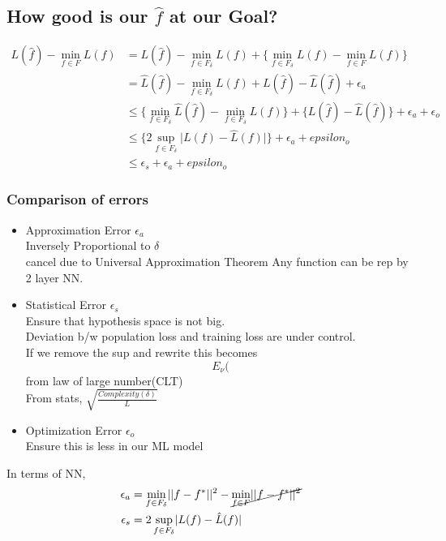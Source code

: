 \documentclass[11pt]{article}
\begin{document}
\subsection{How good is our \(\hat{f}\) at our Goal?}
\label{sec:org99a0065}
\begin{align*}
 L(\hat{f}) - \min_{f \in F}L(f) &= L(\hat{f})
                                   - \min_{f \in F_\delta} L(f)
                                   + \{\min_{f \in F_\delta} L(f)
                                   - \min_{f \in F} L(f) \} \\
  &= \hat{L}(\hat{f}) - \min_{f \in F_\delta} L(f) +
     L(\hat{f}) - \hat{L}(\hat{f}) + \epsilon_a \\
  &\leq \{ \min_{f \in F_\delta}\hat{L}(\hat{f}) -
    \min_{f \in F_\delta} L(f) \} + \{ L(\hat{f}) -
    \hat{L}(\hat{f}) \} + \epsilon_a + \epsilon_o \\
  &\leq \{ 2 \sup_{f \in F_\delta} \lvert L(f) - \hat{L}(f) \rvert \} +
    \epsilon_a + epsilon_o \\
  &\leq \epsilon_s + \epsilon_a + epsilon_o
\end{align*}

\subsubsection{Comparison of errors}
\label{sec:org37fe096}
\begin{itemize}
\item Approximation Error \(\epsilon_a\)\\
Inversely Proportional to \(\delta\)\\
cancel due to Universal Approximation Theorem Any function can be rep by 2 layer NN.\\
\item Statistical Error \(\epsilon_s\)\\
Ensure that hypothesis space is not big.\\
Deviation b/w population loss and training loss are under control.\\
If we remove the sup and rewrite this becomes\\
\[E_{\nu}(\] from law of large number(CLT)\\
From stats, \(\sqrt{\frac{Complexity(\delta)}{L}}\)\\
\item Optimization Error \(\epsilon_o\)\\
Ensure this is less in our ML model\\
\end{itemize}
In terms of NN,\\
\begin{align*}
  \epsilon_a &= \min_{f \in F_\delta} \lvert\lvert f - f^* \rvert\rvert^2 -
               \cancel{ \min_{f \in F} \lvert\lvert f - f^*
               \rvert\rvert^2} \\
  \epsilon_s &= 2 \sup_{f \in F_\delta} \lvert L(f) - \hat{L}(f) \rvert \\
\end{align*}
\end{document}
